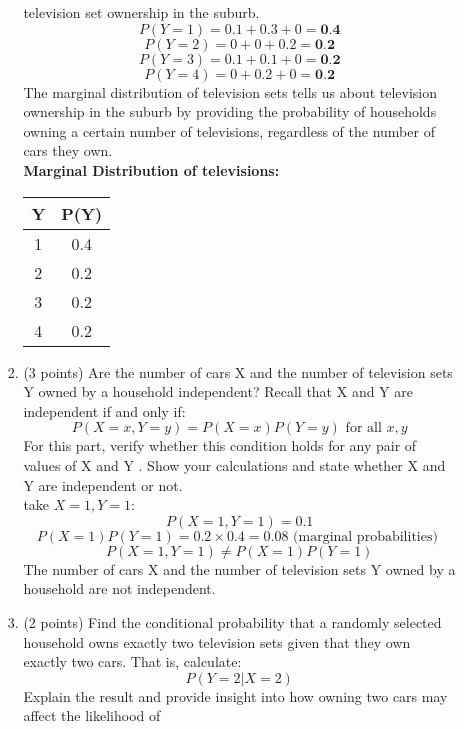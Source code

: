 \documentclass[a3paper,12pt]{article} %
\begin{document}
\begin{enumerate}
\begin{enumerate}
\begin{enumerate}
        television set ownership in the suburb.
        \[
            P(Y = 1) = 0.1 + 0.3 + 0  = \textbf{0.4}
        \]
        \[
            P(Y = 2) = 0 + 0 +  0.2 = \textbf{0.2}
        \]
        \[
            P(Y = 3) = 0.1 + 0.1 + 0 = \textbf{0.2}
        \]
        \[
            P(Y = 4) = 0 + 0.2 + 0 = \textbf{0.2}
        \]
        The marginal distribution of  television sets tells us about television ownership in the suburb by providing the probability of households owning a certain number of televisions, regardless of the number of cars they own.
        \\ \textbf{Marginal Distribution of televisions:}
        \begin{center}
            \begin{tabular}{|c|c|}
                \hline
                Y & P(Y) \\
                \hline
                1 & 0.4 \\
                \hline
                2 & 0.2 \\
                \hline
                3 & 0.2 \\
                \hline
                4 & 0.2 \\
                \hline
            \end{tabular}
        \end{center}
        \item (3 points) Are the number of cars X and the number of television sets Y owned by a
        household independent? Recall that X and Y are independent if and only if:
        \[
            P(X = x, Y = y) = P(X = x)P(Y = y) \text{ for all } x, y
        \]
        For this part, verify whether this condition holds for any pair of values of X and Y . Show
        your calculations and state whether X and Y are independent or not.
        \\ take \(X = 1, Y = 1\):
        \[
            P(X = 1, Y = 1) = 0.1
        \]
        \[
            P(X = 1)P(Y = 1) = 0.2 \times 0.4 = 0.08 \text{ (marginal probabilities) }
        \]
        \[
            P(X = 1, Y = 1) \neq P(X = 1)P(Y = 1)
        \]
        The number of cars X and the number of television sets Y owned by a household are not independent.
        \item (2 points) Find the conditional probability that a randomly selected household owns
        exactly two television sets given that they own exactly two cars. That is, calculate:
        \[
            P(Y = 2 |X = 2)
        \]
        Explain the result and provide insight into how owning two cars may affect the likelihood of

\end{enumerate}
\end{enumerate}
\end{enumerate}
\end{document}
